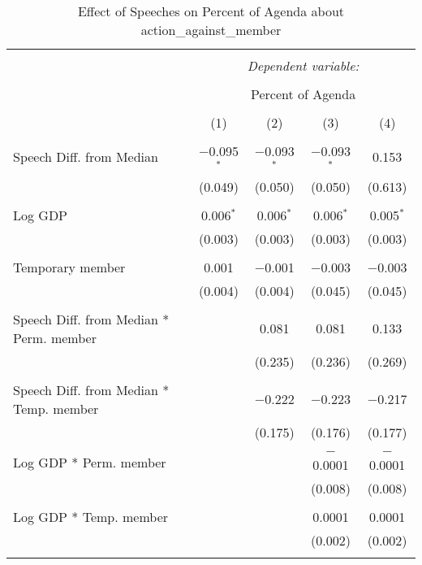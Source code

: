 
\begin{table}[!htbp] \centering 
  \caption{Effect of Speeches on Percent of Agenda about action_against_member} 
  \label{} 
\begin{tabular}{@{\extracolsep{5pt}}lcccc} 
\\[-1.8ex]\hline 
\hline \\[-1.8ex] 
 & \multicolumn{4}{c}{\textit{Dependent variable:}} \\ 
\cline{2-5} 
\\[-1.8ex] & \multicolumn{4}{c}{Percent of Agenda} \\ 
\\[-1.8ex] & (1) & (2) & (3) & (4)\\ 
\hline \\[-1.8ex] 
 Speech Diff. from Median & $-$0.095$^{*}$ & $-$0.093$^{*}$ & $-$0.093$^{*}$ & 0.153 \\ 
  & (0.049) & (0.050) & (0.050) & (0.613) \\ 
  & & & & \\ 
 Log GDP & 0.006$^{*}$ & 0.006$^{*}$ & 0.006$^{*}$ & 0.005$^{*}$ \\ 
  & (0.003) & (0.003) & (0.003) & (0.003) \\ 
  & & & & \\ 
 Temporary member & 0.001 & $-$0.001 & $-$0.003 & $-$0.003 \\ 
  & (0.004) & (0.004) & (0.045) & (0.045) \\ 
  & & & & \\ 
 Speech Diff. from Median * Perm. member &  & 0.081 & 0.081 & 0.133 \\ 
  &  & (0.235) & (0.236) & (0.269) \\ 
  & & & & \\ 
 Speech Diff. from Median * Temp. member &  & $-$0.222 & $-$0.223 & $-$0.217 \\ 
  &  & (0.175) & (0.176) & (0.177) \\ 
  & & & & \\ 
 Log GDP * Perm. member &  &  & $-$0.0001 & $-$0.0001 \\ 
  &  &  & (0.008) & (0.008) \\ 
  & & & & \\ 
 Log GDP * Temp. member &  &  & 0.0001 & 0.0001 \\ 
  &  &  & (0.002) & (0.002) \\ 
  & & & & \\ 

\end{tabular}
\end{table}
